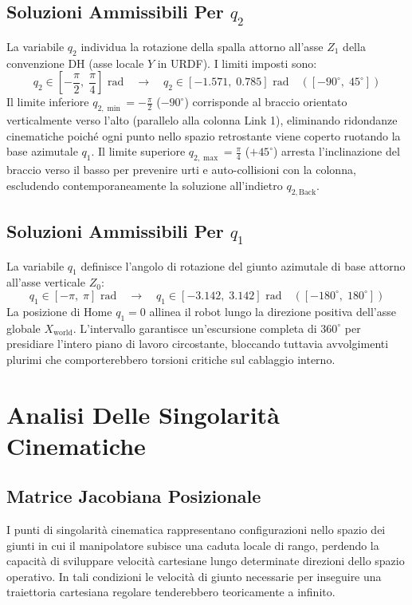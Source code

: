 \documentclass[11pt, a4paper]{report}
\begin{document}
\section{Soluzioni Ammissibili Per $q_2$}
La variabile $q_{2}$ individua la rotazione della spalla attorno all'asse $Z_{1}$ della convenzione DH (asse locale $Y$ in URDF). I limiti imposti sono:
\[
    q_2 \in \left[-\frac{\pi}{2}, \; \frac{\pi}{4}\right]\text{ rad} \quad\longrightarrow\quad q_{2} \in [-1.571, \; 0.785]\text{ rad} \quad ([-90^\circ, \; 45^\circ])
\]
Il limite inferiore $q_{2, \min} = -\frac{\pi}{2}$ ($-90^\circ$) corrisponde al braccio orientato verticalmente verso l'alto (parallelo alla colonna Link 1), eliminando ridondanze cinematiche poiché ogni punto nello spazio retrostante viene coperto ruotando la base azimutale $q_1$. Il limite superiore $q_{2, \max} = \frac{\pi}{4}$ ($+45^\circ$) arresta l'inclinazione del braccio verso il basso per prevenire urti e auto-collisioni con la colonna, escludendo contemporaneamente la soluzione all'indietro $q_{2,\text{Back}}$.

\section{Soluzioni Ammissibili Per $q_1$}
La variabile $q_{1}$ definisce l'angolo di rotazione del giunto azimutale di base attorno all'asse verticale $Z_0$:
\[
    q_1 \in [-\pi, \; \pi]\text{ rad} \quad\longrightarrow\quad q_{1} \in [-3.142, \; 3.142]\text{ rad} \quad ([-180^\circ, \; 180^\circ])
\]
La posizione di Home $q_1 = 0$ allinea il robot lungo la direzione positiva dell'asse globale $X_{\text{world}}$. L'intervallo garantisce un'escursione completa di $360^\circ$ per presidiare l'intero piano di lavoro circostante, bloccando tuttavia avvolgimenti plurimi che comporterebbero torsioni critiche sul cablaggio interno.



\chapter{Analisi Delle Singolarità Cinematiche}
\label{chap:singolarita}

\section{Matrice Jacobiana Posizionale}
I punti di singolarità cinematica rappresentano configurazioni nello spazio dei giunti in cui il manipolatore subisce una caduta locale di rango, perdendo la capacità di sviluppare velocità cartesiane lungo determinate direzioni dello spazio operativo. In tali condizioni le velocità di giunto necessarie per inseguire una traiettoria cartesiana regolare tenderebbero teoricamente a infinito.
\end{document}
